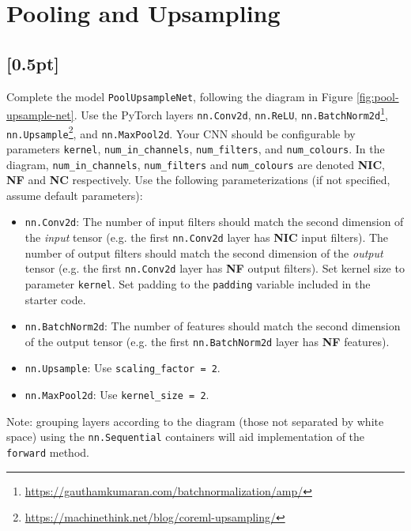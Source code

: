 \section{Pooling and Upsampling}

\subsection{{\color{blue}[0.5pt] \LI}}

Complete the model \texttt{PoolUpsampleNet}, following the diagram in Figure \ref{fig:pool-upsample-net}. 
Use the PyTorch layers \texttt{nn.Conv2d}, \texttt{nn.ReLU}, \texttt{nn.BatchNorm2d}\footnote{\url{https://gauthamkumaran.com/batchnormalization/amp/}}, \texttt{nn.Upsample}\footnote{\url{https://machinethink.net/blog/coreml-upsampling/}}, and \texttt{nn.MaxPool2d}. 
Your CNN should be configurable by parameters \texttt{kernel}, \texttt{num\_in\_channels}, \texttt{num\_filters}, and \texttt{num\_colours}. 
In the diagram, \texttt{num\_in\_channels}, \texttt{num\_filters} and \texttt{num\_colours} are denoted \textbf{NIC}, \textbf{NF} and \textbf{NC} respectively. 
Use the following parameterizations (if not specified, assume default parameters):

\begin{itemize}
  \item \texttt{nn.Conv2d}: The number of input filters should match the second dimension of the \textit{input} tensor (e.g. the first \texttt{nn.Conv2d} layer has \textbf{NIC} input filters). The number of output filters should match the second dimension of the \textit{output} tensor (e.g. the first \texttt{nn.Conv2d} layer has \textbf{NF} output filters). Set kernel size to parameter \texttt{kernel}. Set padding to the \texttt{padding} variable included in the starter code.
  \item \texttt{nn.BatchNorm2d}: The number of features should match the second dimension of the output tensor (e.g. the first \texttt{nn.BatchNorm2d} layer has \textbf{NF} features).
  \item \texttt{nn.Upsample}: Use \texttt{scaling\_factor = 2}.
  \item \texttt{nn.MaxPool2d}: Use \texttt{kernel\_size = 2}.
\end{itemize}

Note: grouping layers according to the diagram (those not separated by white space) using the \texttt{nn.Sequential} containers will aid implementation of the \texttt{forward} method.

